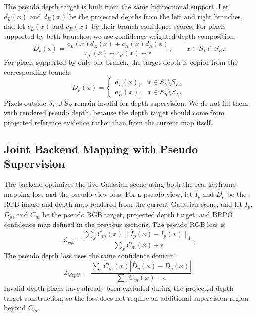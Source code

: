 The pseudo depth target is built from the same bidirectional support. Let $d_L(x)$ and $d_R(x)$ be the projected depths from the left and right branches, and let $c_L(x)$ and $c_R(x)$ be their branch confidence scores. For pixels supported by both branches, we use confidence-weighted depth composition:
\begin{equation}
D_p(x)
=
\frac{c_L(x)d_L(x)+c_R(x)d_R(x)}
{c_L(x)+c_R(x)+\epsilon},
\qquad x\in S_L\cap S_R .
\end{equation}
For pixels supported by only one branch, the target depth is copied from the corresponding branch:
\begin{equation}
D_p(x)=
\begin{cases}
d_L(x), & x\in S_L\setminus S_R,\\
d_R(x), & x\in S_R\setminus S_L.
\end{cases}
\end{equation}
Pixels outside $S_L\cup S_R$ remain invalid for depth supervision. We do not fill them with rendered pseudo depth, because the depth target should come from projected reference evidence rather than from the current map itself.

\subsection{Joint Backend Mapping with Pseudo Supervision}
\label{sec:joint_backend_mapping}

The backend optimizes the live Gaussian scene using both the real-keyframe mapping loss and the pseudo-view loss. For a pseudo view, let $\hat{I}_p$ and $\hat{D}_p$ be the RGB image and depth map rendered from the current Gaussian scene, and let $I_p$, $D_p$, and $C_m$ be the pseudo RGB target, projected depth target, and BRPO confidence map defined in the previous sections. The pseudo RGB loss is
\begin{equation}
\mathcal{L}_{rgb}
=
\frac{
\sum_x C_m(x)\|\hat{I}_p(x)-I_p(x)\|_1
}{
\sum_x C_m(x)+\epsilon
}.
\end{equation}
The pseudo depth loss uses the same confidence domain:
\begin{equation}
\mathcal{L}_{depth}
=
\frac{
\sum_x C_m(x)|\hat{D}_p(x)-D_p(x)|
}{
\sum_x C_m(x)+\epsilon
}.
\end{equation}
Invalid depth pixels have already been excluded during the projected-depth target construction, so the loss does not require an additional supervision region beyond $C_m$.

